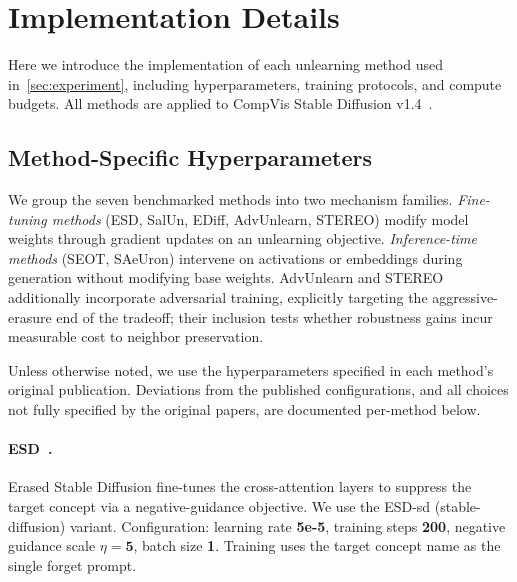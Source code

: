 \section{Implementation Details}
\label{app:implementation}
Here we introduce the implementation of each unlearning method used in~\cref{sec:experiment}, including hyperparameters, training protocols, and compute budgets. All methods are applied to CompVis Stable Diffusion v1.4~\citep{rombach2022high}.

\subsection{Method-Specific Hyperparameters}
We group the seven benchmarked methods into two mechanism 
families. \emph{Fine-tuning methods} (ESD, SalUn, EDiff, 
AdvUnlearn, STEREO) modify model weights through gradient 
updates on an unlearning objective. \emph{Inference-time methods} (SEOT, SAeUron) intervene on activations or embeddings during generation without modifying base weights. AdvUnlearn and STEREO additionally incorporate adversarial training, explicitly targeting the aggressive-erasure end of the tradeoff; their inclusion tests whether robustness gains incur measurable cost to neighbor preservation.

Unless otherwise noted, we use the hyperparameters specified in each method's original publication. Deviations from the published configurations, and all choices not fully specified by the original 
papers, are documented per-method below.
\paragraph{ESD~\citep{gandikota2023erasing}.} 
Erased Stable Diffusion fine-tunes the cross-attention 
layers to suppress the target concept via a negative-guidance objective. We use the ESD-sd (stable-diffusion) variant. 
Configuration: learning rate \textbf{5e-5}, training steps \textbf{200}, negative guidance scale $\eta = \textbf{5}$, 
batch size \textbf{1}. Training uses the target concept name as the single forget prompt.

